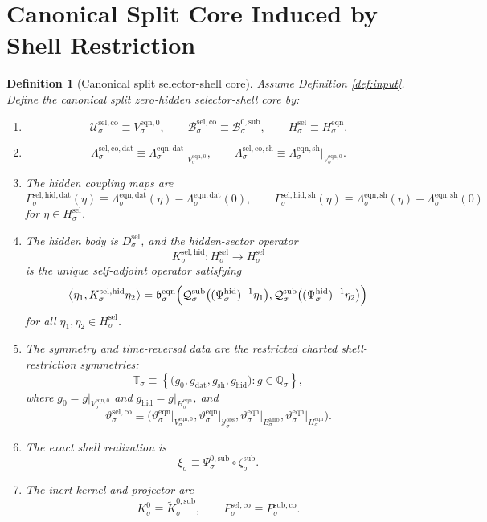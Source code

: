 \documentclass[11pt]{article}
\newcommand{\DataSpace}[1]{\mathcal Y_{#1}^{\mathrm{obs}}}
\newcommand{\AmbientTarget}[1]{E_{#1}^{\mathrm{amb}}}
\newcommand{\EqnZero}[1]{V_{#1}^{\mathrm{eqn},0}}
\newcommand{\EqnHidden}[1]{H_{#1}^{\mathrm{eqn}}}
\newcommand{\EqnData}[1]{\Lambda_{#1}^{\mathrm{eqn,dat}}}
\newcommand{\EqnShell}[1]{\Lambda_{#1}^{\mathrm{eqn,sh}}}
\newcommand{\EqnPair}[1]{\mathfrak b_{#1}^{\mathrm{eqn}}}
\newcommand{\EqnSym}[1]{\mathbb Q_{#1}}
\newcommand{\EqnTime}[1]{\vartheta_{#1}^{\mathrm{eqn}}}
\newcommand{\SubZeroChart}[1]{\Psi_{#1}^{0,\mathrm{sub}}}
\newcommand{\HiddenChart}[1]{\Psi_{#1}^{\mathrm{hid}}}
\newcommand{\SubCharge}[1]{\mathcal Q_{#1}^{\mathrm{sub}}}
\newcommand{\SubEmbed}[1]{\zeta_{#1}^{\mathrm{sub}}}
\newcommand{\SubKernelCh}[1]{\widetilde K_{#1}^{0,\mathrm{sub}}}
\newcommand{\SubStateComp}[1]{P_{#1}^{\mathrm{sub,co}}}
\newcommand{\ZeroBody}[1]{\mathcal B_{#1}^{0,\mathrm{sub}}}
\newcommand{\SelCoreSpace}[1]{\mathcal U_{#1}^{\mathrm{sel,co}}}
\newcommand{\SelCoreBody}[1]{\mathcal B_{#1}^{\mathrm{sel,co}}}
\newcommand{\SelCoreData}[1]{\Lambda_{#1}^{\mathrm{sel,co,dat}}}
\newcommand{\SelCoreShell}[1]{\Lambda_{#1}^{\mathrm{sel,co,sh}}}
\newcommand{\GapSpace}[1]{H_{#1}^{\mathrm{sel}}}
\newcommand{\GapBody}[1]{D_{#1}^{\mathrm{sel}}}
\newcommand{\SelHiddenData}[1]{\Gamma_{#1}^{\mathrm{sel,hid,dat}}}
\newcommand{\SelHiddenShell}[1]{\Gamma_{#1}^{\mathrm{sel,hid,sh}}}
\newcommand{\HiddenOperator}[1]{K_{#1}^{\mathrm{sel,hid}}}
\newcommand{\SelCoreSym}[1]{\mathbb T_{#1}}
\newcommand{\SelCoreTime}[1]{\vartheta_{#1}^{\mathrm{sel,co}}}
\newcommand{\SelCoreEmbed}[1]{\xi_{#1}}
\newcommand{\Kernel}[1]{K_{#1}^{0}}
\newcommand{\SelCoreProj}[1]{P_{#1}^{\mathrm{sel,co}}}
\newtheorem{definition}{Definition}
\begin{document}
\section{Canonical Split Core Induced by Shell Restriction}

\begin{definition}[Canonical split selector-shell core]
\label{def:core}
Assume Definition \ref{def:input}. Define the canonical split zero-hidden selector-shell core by:
\begin{enumerate}
    \item
    \[
    \SelCoreSpace{\sigma}\equiv\EqnZero{\sigma},
    \qquad
    \SelCoreBody{\sigma}\equiv\ZeroBody{\sigma},
    \qquad
    \GapSpace{\sigma}\equiv\EqnHidden{\sigma}.
    \]
    \item
    \[
    \SelCoreData{\sigma}
    \equiv
    \EqnData{\sigma}\big|_{\EqnZero{\sigma}},
    \qquad
    \SelCoreShell{\sigma}
    \equiv
    \EqnShell{\sigma}\big|_{\EqnZero{\sigma}}.
    \]
    \item The hidden coupling maps are
    \begin{equation}
    \SelHiddenData{\sigma}(\eta)
    \equiv
    \EqnData{\sigma}(\eta)-\EqnData{\sigma}(0),
    \qquad
    \SelHiddenShell{\sigma}(\eta)
    \equiv
    \EqnShell{\sigma}(\eta)-\EqnShell{\sigma}(0)
    \label{eq:couplings}
    \end{equation}
    for \(\eta\in\GapSpace{\sigma}\).
    \item The hidden body is \(\GapBody{\sigma}\), and the hidden-sector operator
    \[
    \HiddenOperator{\sigma}:\GapSpace{\sigma}\to\GapSpace{\sigma}
    \]
    is the unique self-adjoint operator satisfying
    \begin{equation}
    \ev{\eta_{1},\HiddenOperator{\sigma}\eta_{2}}
    =
    \EqnPair{\sigma}\Bigl(
    \SubCharge{\sigma}\bigl((\HiddenChart{\sigma})^{-1}\eta_{1}\bigr),
    \SubCharge{\sigma}\bigl((\HiddenChart{\sigma})^{-1}\eta_{2}\bigr)
    \Bigr)
    \label{eq:hiddenoperator}
    \end{equation}
    for all \(\eta_{1},\eta_{2}\in\GapSpace{\sigma}\).
    \item The symmetry and time-reversal data are the restricted charted shell-restriction symmetries:
    \[
    \SelCoreSym{\sigma}
    \equiv
    \left\{
    \bigl(
    g_{0},g_{\mathrm{dat}},g_{\mathrm{sh}},g_{\mathrm{hid}}
    \bigr):
    g\in\EqnSym{\sigma}
    \right\},
    \]
    where \(g_{0}=g|_{\EqnZero{\sigma}}\) and \(g_{\mathrm{hid}}=g|_{\EqnHidden{\sigma}}\), and
    \[
    \SelCoreTime{\sigma}
    \equiv
    \bigl(
    \EqnTime{\sigma}\big|_{\EqnZero{\sigma}},
    \EqnTime{\sigma}\big|_{\DataSpace{\sigma}},
    \EqnTime{\sigma}\big|_{\AmbientTarget{\sigma}},
    \EqnTime{\sigma}\big|_{\EqnHidden{\sigma}}
    \bigr).
    \]
    \item The exact shell realization is
    \[
    \SelCoreEmbed{\sigma}
    \equiv
    \SubZeroChart{\sigma}\circ\SubEmbed{\sigma}.
    \]
    \item The inert kernel and projector are
    \[
    \Kernel{\sigma}\equiv\SubKernelCh{\sigma},
    \qquad
    \SelCoreProj{\sigma}\equiv\SubStateComp{\sigma}.
    \]
\end{enumerate}
\end{definition}
\end{document}
